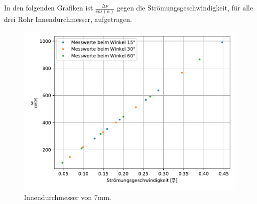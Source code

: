 \noindent
In den folgenden Grafiken ist $\frac{\increment \nu}{cos(\alpha)}$ gegen die Strömungsgeschwindigkeit, für alle drei Rohr Innendurchmesser, aufgetragen.

\begin{figure}
    \centering
    \includegraphics{Daten/7mm.pdf}
    \caption{Innendurchmesser von 7mm.}
    \label{fig:KeineAhnung}
\end{figure}

